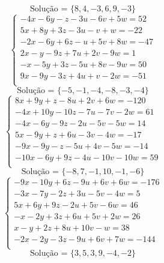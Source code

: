 \documentclass[12pt,oneside,a4paper]{article}
\begin{document}
\begin{equation*}
\text{Solução = }\{8,4,-3,6,9,-3\}
\end{equation*}
\vspace{\baselineskip}
\begin{equation*}
\begin{cases}
-4x-6y-z-3u-6v+5w=52 \\
5x+8y+3z-3u-v+w=-22 \\
-2x-6y+6z-u+5v+8w=-47 \\
2x-y-9z+7u+2v-9w=1 \\
-x-5y+3z-5u+8v-9w=50 \\
9x-9y-3z+4u+v-2w=-51 \\
\end{cases}
\end{equation*}
\begin{equation*}
\text{Solução = }\{-5,-1,-4,-8,-3,-4\}
\end{equation*}
\vspace{\baselineskip}
\begin{equation*}
\begin{cases}
8x+9y+z-8u+2v+6w=-120 \\
-4x+10y-10z-7u-7v-2w=61 \\
-4x-6y-9z-2u-5v-5w=14 \\
5x-9y+z+6u-3v-4w=-17 \\
-9x-9y-z-5u+4v-5w=-14 \\
-10x-6y+9z-4u-10v-10w=59 \\
\end{cases}
\end{equation*}
\begin{equation*}
\text{Solução = }\{-8,7,-1,10,-1,-6\}
\end{equation*}
\vspace{\baselineskip}
\begin{equation*}
\begin{cases}
-9x-10y+6z-9u+6v+6w=-176 \\
-3x-7y-2z+3u-5v-4w=5 \\
5x+6y+9z-2u+5v-6w=46 \\
-x-2y+3z+6u+5v+2w=26 \\
x-y+2z+8u+10v-w=38 \\
-2x-2y-3z-9u+6v+7w=-144 \\
\end{cases}
\end{equation*}
\begin{equation*}
\text{Solução = }\{3,5,3,9,-4,-2\}
\end{equation*}
\end{document}
